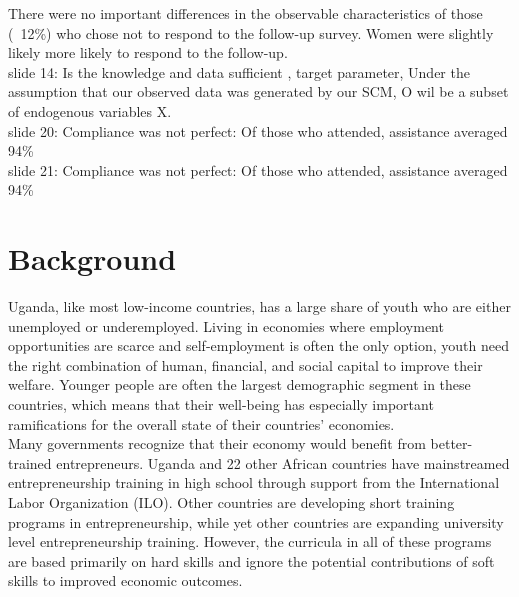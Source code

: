 \documentclass[oneside, notitlepage]{book}
\begin{document}
There were no important differences in the observable characteristics of those (~12\%) who chose not to respond to the follow-up survey. Women were slightly likely more likely to respond to the follow-up.\\

slide 14: Is the knowledge and data sufficient , target parameter, Under the assumption that our observed data was generated by our SCM, O wil be a subset of endogenous variables X. \\

slide 20: Compliance was not perfect: Of those who attended, assistance averaged 94\% \\

slide 21: Compliance was not perfect: Of those who attended, assistance averaged 94\%



\section{Background}
\label{cha:backgr-quest-quest}

Uganda, like most low-income countries, has a large share of youth who are either unemployed or underemployed. Living in economies where employment opportunities are scarce and self-employment is often the only option, youth need the right combination of human, financial, and social capital to improve their welfare. Younger people are often the largest demographic segment in these countries, which means that their well-being has especially important ramifications for the overall state of their countries' economies.\\

Many governments recognize that their economy would benefit from better-trained entrepreneurs. Uganda and 22 other African countries have mainstreamed entrepreneurship training in high school through support from the International Labor Organization (ILO). Other countries are developing short training programs in entrepreneurship, while yet other countries are expanding university level entrepreneurship training. However, the curricula in all of these programs are based primarily on hard skills and ignore the potential contributions of soft skills to improved economic outcomes.\\
\end{document}
